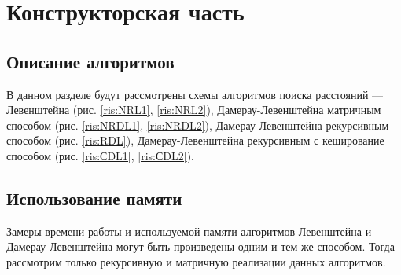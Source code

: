 \chapter{Конструкторская часть}

\section{Описание алгоритмов}
В данном разделе будут рассмотрены схемы алгоритмов поиска расстояний --- Левенштейна (рис. \ref{ris:NRL1}, \ref{ris:NRL2}), Дамерау-Левенштейна матричным способом (рис. \ref{ris:NRDL1}, \ref{ris:NRDL2}), Дамерау-Левенштейна рекурсивным способом (рис. \ref{ris:RDL}), Дамерау-Левенштейна рекурсивным с кеширование способом (рис. \ref{ris:СDL1}, \ref{ris:СDL2}).
\begin{center}
	

\newpage
	\centering
	\def\svgwidth{14cm}
	
	\label{ris:NRL1}
\newpage

\centering
\def\svgwidth{14cm}

\label{ris:NRL2}
\newpage

\centering
\def\svgwidth{14cm}

\label{ris:NRDL1}
\newpage

\centering
\def\svgwidth{14cm}

\label{ris:NRDL2}
\newpage

\centering
\def\svgwidth{12cm}

\label{ris:RDL}
\newpage

\centering
\def\svgwidth{14cm}

\label{ris:СDL1}
\newpage

\centering
\def\svgwidth{11cm}

\label{ris:СDL2}
\newpage

\end{center}


\section{Использование памяти}
Замеры времени работы и используемой памяти алгоритмов Левенштейна и Дамерау-Левенштейна могут быть произведены одним и тем же способом.
Тогда рассмотрим только рекурсивную и матричную реализации данных алгоритмов.

